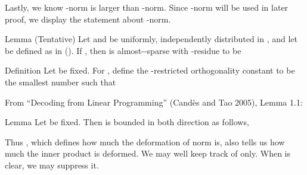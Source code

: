 Lastly, we know -norm is larger than -norm.
Since -norm will be used in later proof, we display the statement about -norm.

\Result
{Lemma (Tentative)}
{
Let  and  be uniformly, independently distributed in \m {[0,2\pi)}, and let  be defined as in ().
If , then  is almost--sparse with -residue  to be
}

\startsection [title={Concentration Inequality of \m {\M{F}_B, \M{W}_B}}]

\Result
{Definition}
{
Let  be fixed.
For , define the -restricted orthogonality constant  to be the smallest number such that
}

From ``Decoding from Linear Programming'' (Cand\`es and Tao 2005), Lemma 1.1:

\Result
{Lemma}
{
Let  be fixed.
Then  is bounded in both direction as follows,
}

Thus , which defines how much the deformation of norm is, also tells us how much the inner product is deformed.
We may well keep track of  only.
When  is clear, we may suppress it.

